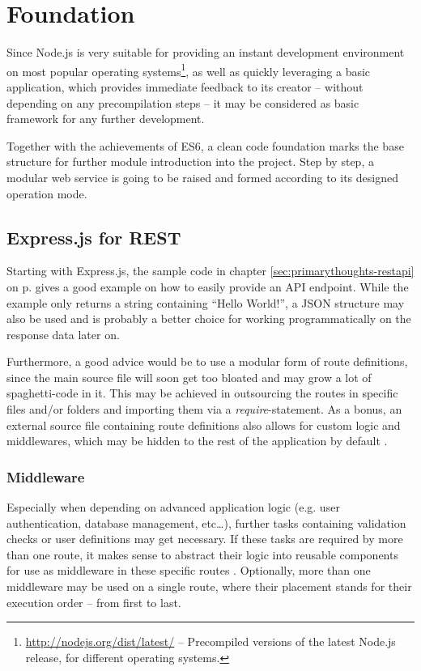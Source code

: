 \section{Foundation}
\label{sec:foundation}

Since Node.js is very suitable for providing an instant development environment on most popular operating systems\footnote{\url{http://nodejs.org/dist/latest/} -- Precompiled versions of the latest Node.js release, for different operating systems.}, as well as quickly leveraging a basic application, which provides immediate feedback to its creator -- without depending on any precompilation steps -- it may be considered as basic framework for any further development.

Together with the achievements of ES6, a clean code foundation marks the base structure for further module introduction into the project. Step by step, a modular web service is going to be raised and formed according to its designed operation mode.

\subsection{Express.js for REST}
\label{sec:foundation-express}
Starting with Express.js, the sample code in chapter \ref{sec:primarythoughts-restapi} on p. \pageref{sec:primarythoughts-restapi} gives a good example on how to easily provide an API endpoint. While the example only returns a string containing ``Hello World!'', a JSON structure may also be used and is probably a better choice for working programmatically on the response data later on.

Furthermore, a good advice would be to use a modular form of route definitions, since the main source file will soon get too bloated and may grow a lot of spaghetti-code in it. This may be achieved in outsourcing the routes in specific files and/or folders and importing them via a \emph{require}-statement. As a bonus, an external source file containing route definitions also allows for custom logic and middlewares, which may be hidden to the rest of the application by default \cite[p. 220f]{cantelon2017node}.

\subsubsection{Middleware}
Especially when depending on advanced application logic (e.g. user authentication, database management, etc\ldots), further tasks containing validation checks or user definitions may get necessary. If these tasks are required by more than one route, it makes sense to abstract their logic into reusable components for use as middleware in these specific routes \cite[223]{cantelon2017node}. Optionally, more than one middleware may be used on a single route, where their placement stands for their execution order -- from first to last.

